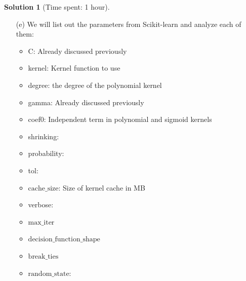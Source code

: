 \documentclass[11pt, reqno, letterpaper, twoside]{amsart}
\theoremstyle{plain}
\theoremstyle{definition}
\newtheorem{solution}[theorem]{Solution}
\begin{document}
\begin{solution}[Time spent: 1 hour]
\begin{enumerate}

\item[(e)] We will list out the parameters from Scikit-learn and analyze each of them: 
\begin{itemize}
    \item C: Already discussed previously
    \item kernel: Kernel function to use 
    \item degree: the degree of the polynomial kernel 
    \item gamma: Already discussed previously
    \item coef0: Independent term in polynomial and sigmoid kernels
    \item shrinking: 
    \item probability: 
    \item tol:
    \item $\text{cache\_size}$: Size of kernel cache in MB
    \item verbose: 
    \item $\text{max\_iter}$
    \item $\text{decision\_function\_shape}$
    \item $\text{break\_ties}$
    \item $\text{random\_state}$: 

\end{itemize}
    
\end{enumerate}
\end{solution}
\end{document}
